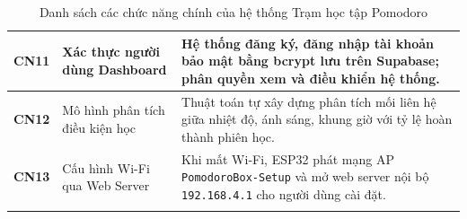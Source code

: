 \begin{longtable}{|c|p{4.5cm}|p{8.5cm}|}
\textbf{CN11} & Xác thực người dùng Dashboard & Hệ thống đăng ký, đăng nhập tài khoản bảo mật bằng bcrypt lưu trên Supabase; phân quyền xem và điều khiển hệ thống. \\ \hline

\textbf{CN12} & Mô hình phân tích điều kiện học & Thuật toán tự xây dựng phân tích mối liên hệ giữa nhiệt độ, ánh sáng, khung giờ với tỷ lệ hoàn thành phiên học. \\ \hline

\textbf{CN13} & Cấu hình Wi-Fi qua Web Server & Khi mất Wi-Fi, ESP32 phát mạng AP \texttt{PomodoroBox-Setup} và mở web server nội bộ \texttt{192.168.4.1} cho người dùng cài đặt. \\ \hline
\caption{Danh sách các chức năng chính của hệ thống Trạm học tập Pomodoro}
\label{tab:danh_sach_chuc_nang}
\end{longtable}
